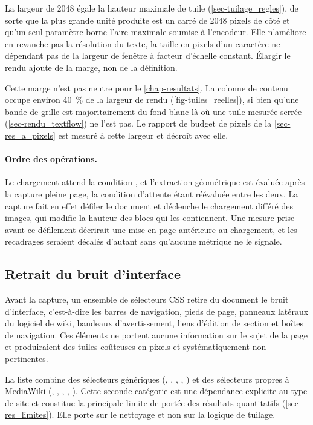 La largeur de \SI{2048}{\pixel} égale la hauteur maximale de tuile
(\cref{sec-tuilage_regles}), de sorte que la plus grande unité produite est un
carré de \num{2048} pixels de côté et qu'un seul paramètre borne l'aire maximale
soumise à l'encodeur. Elle n'améliore en revanche pas la résolution du texte, la
taille en pixels d'un caractère ne dépendant pas de la largeur de fenêtre à
facteur d'échelle constant. Élargir le rendu ajoute de la marge, non de la
définition.

Cette marge n'est pas neutre pour le \cref{chap-resultats}. La colonne de
contenu occupe environ \SI{40}{\percent} de la largeur de rendu
(\cref{fig-tuiles_reelles}), si bien qu'une bande de grille est majoritairement
du fond blanc là où une tuile mesurée serrée (\cref{sec-rendu_textflow}) ne
l'est pas. Le rapport de budget de pixels de la \cref{sec-res_a_pixels} est
mesuré à cette largeur et décroît avec elle.

\paragraph{Ordre des opérations.} Le chargement attend la condition
, et l'extraction géométrique est évaluée après la capture
pleine page, la condition d'attente étant réévaluée entre les deux. La capture
fait en effet défiler le document et déclenche le chargement différé des images,
qui modifie la hauteur des blocs qui les contiennent. Une mesure prise avant ce
défilement décrirait une mise en page antérieure au chargement, et les
recadrages seraient décalés d'autant sans qu'aucune métrique ne le signale.

\subsection{Retrait du bruit d'interface}

Avant la capture, un ensemble de sélecteurs CSS retire du document le bruit
d'interface, c'est-à-dire les barres de navigation, pieds de page, panneaux
latéraux du logiciel de wiki, bandeaux d'avertissement, liens d'édition de
section et boîtes de navigation. Ces éléments ne portent aucune information sur
le sujet de la page et produiraient des tuiles coûteuses en pixels et
systématiquement non pertinentes.

{\sloppy
La liste combine des sélecteurs génériques (, ,
, , ) et des sélecteurs propres à MediaWiki
(, , ,
, ). Cette seconde catégorie est une
dépendance explicite au type de site et constitue la principale limite de portée
des résultats quantitatifs (\cref{sec-res_limites}). Elle porte sur le nettoyage
et non sur la logique de tuilage.
\par}

